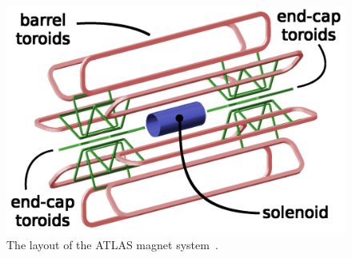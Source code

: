 \vspace{1em}
\begin{figure}[!ht]
  \begin{center}
    \includegraphics[width=0.8\linewidth, angle=0]{figs/Detector/Magnet_schem.png}
  \end{center}
  \caption[The layout of the ATLAS magnet system.]{The layout of the ATLAS magnet system~\cite{det-magnet_fig}.}
  \label{fig:det-magnet_schem}
\end{figure}

